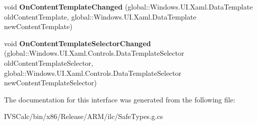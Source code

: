 \begin{DoxyCompactItemize}
void {\bfseries On\+Content\+Template\+Changed} (global\+::\+Windows.\+U\+I.\+Xaml.\+Data\+Template old\+Content\+Template, global\+::\+Windows.\+U\+I.\+Xaml.\+Data\+Template new\+Content\+Template)
\item 
\mbox{\label{interface_windows_1_1_u_i_1_1_xaml_1_1_controls_1_1_i_content_presenter_overrides_a87f3da45b7e3c94762174182d8c0e4bc}} 
void {\bfseries On\+Content\+Template\+Selector\+Changed} (global\+::\+Windows.\+U\+I.\+Xaml.\+Controls.\+Data\+Template\+Selector old\+Content\+Template\+Selector, global\+::\+Windows.\+U\+I.\+Xaml.\+Controls.\+Data\+Template\+Selector new\+Content\+Template\+Selector)
\end{DoxyCompactItemize}


The documentation for this interface was generated from the following file\+:\begin{DoxyCompactItemize}
\item 
I\+V\+S\+Calc/bin/x86/\+Release/\+A\+R\+M/ilc/Safe\+Types.\+g.\+cs\end{DoxyCompactItemize}
